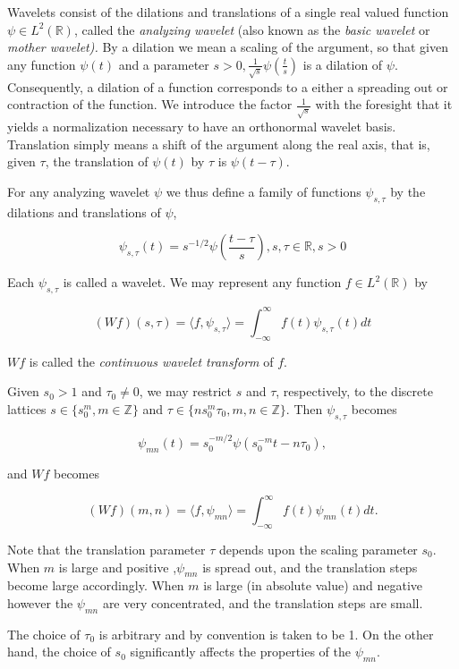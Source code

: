 \documentclass[a4paper,12pt]{article}
\begin{document}
Wavelets consist of the dilations and translations of a single real valued function \(\psi \in L^2(\mathbb{R})\), 
called the \emph{analyzing wavelet} (also known as the \emph{basic wavelet} or \emph{mother wavelet).} By a 
dilation we mean a scaling of the argument, so that given any function \(\psi(t)\) and a 
parameter \(s > 0, \frac{1}{\sqrt{s}} \psi(\frac{t}{s})\) is a dilation of \(\psi\). Consequently, a 
dilation of a function corresponds to a either a spreading out or contraction of the function. We introduce 
the factor \(\frac{1}{\sqrt{s}}\) with the foresight that it yields a normalization necessary to have an 
orthonormal wavelet basis. Translation simply means a shift of the argument along the real axis, that is, 
given \(\tau\), the translation of \(\psi(t)\) by \(\tau\) is \(\psi(t-\tau)\).

For any analyzing wavelet \(\psi\) we thus define a family of functions \(\psi_{s,\tau}\) by the dilations 
and translations of \(\psi\),

\[
\psi_{s,\tau}(t) = s^{-1/2} \psi(\frac{t-\tau}{s}), s, \tau \in \mathbb{R}, s > 0
\]

Each \(\psi_{s,\tau}\) is called a wavelet. We may represent any  function \(f \in L^2(\mathbb{R})\) by

\[
(W f)(s,\tau) = \langle f, \psi_{s,\tau} \rangle = \int_{-\infty}^{\infty} f(t) \psi_{s,\tau}(t) dt
\]

\(W f\) is called the \emph{continuous wavelet transform} of \(f\).

Given \(s_0 > 1\) and \(\tau_0 \neq 0\), we may restrict \(s\) and \(\tau\), respectively, to the discrete 
lattices  \(s \in \{ s_0^m, m \in \mathbb{Z}\}\) and \(\tau \in \{ n s_0^m \tau_0, m, n \in \mathbb{Z}\}\). Then \(\psi_{s,\tau}\) becomes

\[
\psi_{mn}(t) = s_0^{-m/2} \psi(s_0^{-m} t - n \tau_0),
\]

and \(W f\) becomes

\[
(W f)(m,n) = \langle f, \psi_{mn} \rangle = \int_{-\infty}^{\infty} f(t) \psi_{mn}(t) dt.
\]

Note that  the translation parameter \(\tau\) depends upon the scaling parameter \(s_0\).
When \(m\) is large and positive ,\(\psi_{mn}\) is spread out, and the translation steps become large accordingly.
When \(m\) is large (in absolute value) and negative however the \(\psi_{mn}\) are very concentrated, and the translation steps are small.

The choice of \(\tau_0\) is arbitrary and by convention is taken to be 1.
On the other hand, the choice of \(s_0\) significantly affects the properties of the \(\psi_{mn}\).
\end{document}
